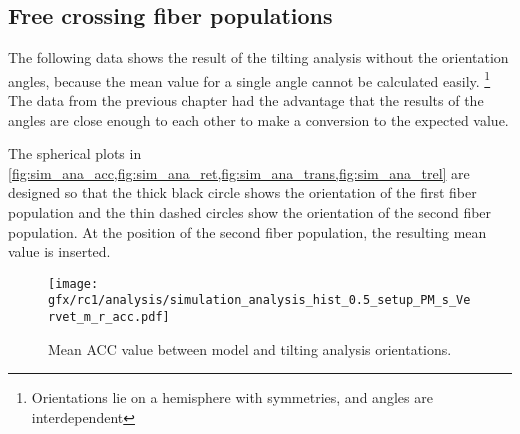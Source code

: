 \subsection{Free crossing fiber populations}
\label{sec:resFreeCross}
%
The following data shows the result of the tilting analysis without the orientation angles, because the mean value for a single angle cannot be calculated easily. \footnote{Orientations lie on a hemisphere with symmetries, and angles are interdependent}
The data from the previous chapter had the advantage that the results of the angles are close enough to each other to make a conversion to the expected value.
\par
%
The spherical plots in \cref{fig:sim_ana_acc,fig:sim_ana_ret,fig:sim_ana_trans,fig:sim_ana_trel} are designed so that the thick black circle shows the orientation of the first fiber population and the thin dashed circles show the orientation of the second fiber population.
At the position of the second fiber population, the resulting mean value is inserted.
%
%
%
\begin{figure}[!p]
\centering
\texttt{[image: gfx/rc1/analysis/simulation\_analysis\_hist\_0.5\_setup\_PM\_s\_Vervet\_m\_r\_acc.pdf]}
\caption{Mean \ac{ACC} value between model and tilting analysis orientations. }
\label{fig:sim_ana_acc}
\end{figure}
%
